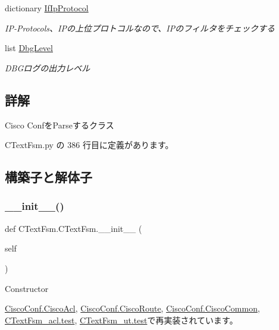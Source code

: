 \begin{DoxyCompactItemize}
dictionary \mbox{\hyperlink{classCTextFsm_1_1CTextFsm_a6c193f4c315d94b59475cb6f1debefe6}{If\+Ip\+Protocol}}
\begin{DoxyCompactList}\small\item\em I\+P-\/\+Protocols、\+I\+Pの上位プロトコルなので、\+I\+Pのフィルタをチェックする \end{DoxyCompactList}\item 
list \mbox{\hyperlink{classCTextFsm_1_1CTextFsm_ac535afde8ac9c209d0a4c3ecee65e4b0}{Dbg\+Level}}
\begin{DoxyCompactList}\small\item\em D\+B\+Gログの出力レベル \end{DoxyCompactList}\end{DoxyCompactItemize}


\subsection{詳解}
\begin{DoxyVerb}Cisco ConfをParseするクラス
\end{DoxyVerb}
 

 C\+Text\+Fsm.\+py の 386 行目に定義があります。



\subsection{構築子と解体子}
\mbox{\label{classCTextFsm_1_1CTextFsm_ae888a03cec9e1bb808d590dc35a9ec6b}} 
\subsubsection{\texorpdfstring{\_\_init\_\_()}{\_\_init\_\_()}}
{\footnotesize\ttfamily def C\+Text\+Fsm.\+C\+Text\+Fsm.\+\_\+\+\_\+init\+\_\+\+\_\+ (\begin{DoxyParamCaption}\item[{}]{self }\end{DoxyParamCaption})}

\begin{DoxyVerb}Constructor
\end{DoxyVerb}
 

\mbox{\hyperlink{classCiscoConf_1_1CiscoAcl_a84104a6a25dd68d24474d15985702ab6}{Cisco\+Conf.\+Cisco\+Acl}}, \mbox{\hyperlink{classCiscoConf_1_1CiscoRoute_a1f0e3788e7f8459ea9de2f8bd21c1b05}{Cisco\+Conf.\+Cisco\+Route}}, \mbox{\hyperlink{classCiscoConf_1_1CiscoCommon_a67ee86ca701af50e95bed0abfcd09dda}{Cisco\+Conf.\+Cisco\+Common}}, \mbox{\hyperlink{classCTextFsm__acl_1_1test_a8d24ace55d8eae0649e764d4ae4ac882}{C\+Text\+Fsm\+\_\+acl.\+test}}, \mbox{\hyperlink{classCTextFsm__ut_1_1test_aa74780257a0e74f90ebdaf0982486dcd}{C\+Text\+Fsm\+\_\+ut.\+test}}で再実装されています。



